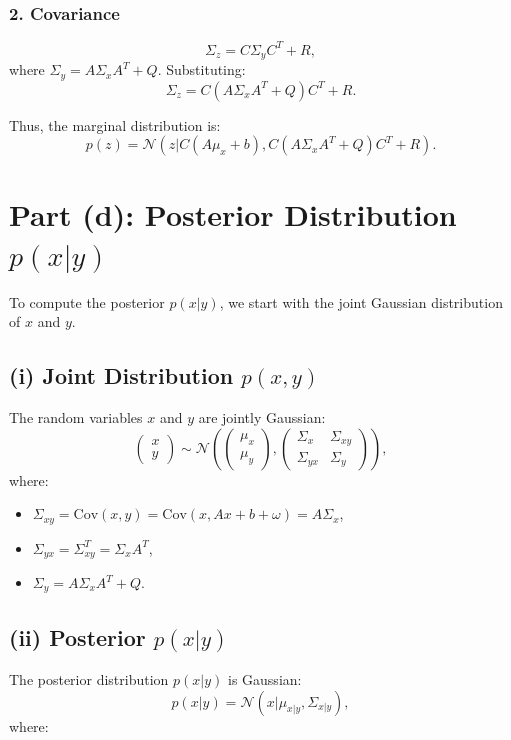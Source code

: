 \documentclass[12pt]{article}
\begin{document}
\subsubsection*{2. Covariance}
\[
\Sigma_z = C \Sigma_y C^T + R,
\]
where \( \Sigma_y = A \Sigma_x A^T + Q \). Substituting:
\[
\Sigma_z = C (A \Sigma_x A^T + Q) C^T + R.
\]

Thus, the marginal distribution is:
\[
p(z) = \mathcal{N}(z | C (A \mu_x + b), C (A \Sigma_x A^T + Q) C^T + R).
\]

\section*{Part (d): Posterior Distribution \( p(x|y) \)}

To compute the posterior \( p(x|y) \), we start with the joint Gaussian distribution of \( x \) and \( y \).

\subsection*{(i) Joint Distribution \( p(x, y) \)}
The random variables \( x \) and \( y \) are jointly Gaussian:
\[
\begin{pmatrix} 
x \\ 
y 
\end{pmatrix}
\sim \mathcal{N}
\left(
\begin{pmatrix}
\mu_x \\
\mu_y
\end{pmatrix},
\begin{pmatrix}
\Sigma_x & \Sigma_{xy} \\
\Sigma_{yx} & \Sigma_y
\end{pmatrix}
\right),
\]
where:
\begin{itemize}
    \item \( \Sigma_{xy} = \text{Cov}(x, y) = \text{Cov}(x, A x + b + \omega) = A \Sigma_x \),
    \item \( \Sigma_{yx} = \Sigma_{xy}^T = \Sigma_x A^T \),
    \item \( \Sigma_y = A \Sigma_x A^T + Q \).
\end{itemize}

\subsection*{(ii) Posterior \( p(x|y) \)}
The posterior distribution \( p(x|y) \) is Gaussian:
\[
p(x|y) = \mathcal{N}(x | \mu_{x|y}, \Sigma_{x|y}),
\]
where:
\end{document}
